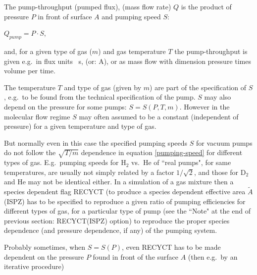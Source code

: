 The pump-throughput (pumped flux), (mass flow rate) $Q$ is the product of
pressure $P$  in front of surface $A$ and pumping speed $S$:

$Q_{pump} = P \cdot S$, 

and, for a given type of gas ($m$) and gas temperature $T$  the pump-throughput
is given e.g.\ in flux units \si{\per\second}, (or: \si{\ampere}), or as mass
flow with dimension pressure times volume per time.

The temperature $T$ and type of gas (given by $m$) are part of the
specification of $S$, e.g.\ to be found from the technical specification of the
pump.
$S$ may also depend on the pressure for some pumps: $S = S(P,T,m)$.
However in the molecular flow regime $S$ may often assumed to be a constant
(independent of pressure) for a given temperature and type of gas.

But normally even in this case	the specified pumping speeds $S$ for vacuum
pumps do not follow the $\sqrt{T/m}$ dependence in equation
\cref{pumping-speed} for different types of gas.
E.g.\ pumping speeds for  H$_2$ vs.\ He of ``real pumps", for same
temperatures, are usually not simply related by a factor $1/\sqrt{2}$, and
those for D$_2$ and He may not be identical either.
In a simulation of a gas mixture then a species dependent flag RECYCT (to
produce a species dependent effective area $\tilde{A}$(ISPZ) has to be
specified to reproduce a given ratio of pumping efficiencies for different
types of gas, for a particular type of pump (see the ``Note" at the end of
previous section: RECYCT(ISPZ) option) to reproduce the proper species
dependence (and pressure dependence, if any) of the pumping system.

Probably sometimes, when $S=S(P)$, even RECYCT has to be made dependent on the
pressure $P$ found in front of the surface $A$ (then e.g.\ by an iterative
procedure)
